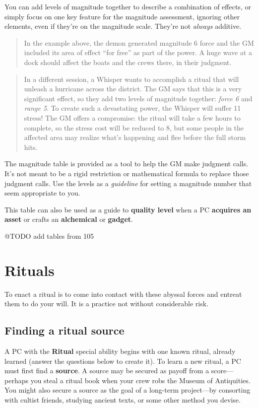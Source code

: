 \documentclass[11pt,fleqn,a5paper]{book}
\newcommand{\gameterm}[1]{\textbf{#1}}
\begin{document}
You can add levels of magnitude together to describe a combination of effects, or simply focus on one key feature for the magnitude assessment, ignoring other elements, even if they’re on the magnitude scale. They’re not \emph{always} additive.

\begin{quote}
	In the example above, the demon generated magnitude 6 force and the GM included its area of effect “for free” as part of the power. A huge wave at a dock should affect the boats and the crews there, in their judgment.
\end{quote} 

\begin{quote}
	In a different session, a Whisper wants to accomplish a ritual that will unleash a hurricane across the district. The GM says that this is a very significant effect, so they add two levels of magnitude together: \emph{force 6} and \emph{range 5}. To create such a devastating power, the Whisper will suffer 11 stress! The GM offers a compromise: the ritual will take a few hours to complete, so the stress cost will be reduced to 8, but some people in the affected area may realize what’s happening and flee before the full storm hits.
\end{quote} 

The magnitude table is provided as a tool to help the GM make judgment calls. It’s not meant to be a rigid restriction or mathematical formula to replace those judgment calls. Use the levels as a \emph{guideline} for setting a magnitude number that seem appropriate to you.

This table can also be used as a guide to \textbf{quality level} when a PC \textbf{acquires an asset }or crafts an \textbf{alchemical} or \textbf{gadget}.

@TODO add tables from 105

\chapter{Rituals}

To enact a ritual is to come into contact with these abyssal forces and entreat them to do your will. It is a practice not without considerable risk.

\section{Finding a ritual source}

A PC with the \gameterm{Ritual}  special ability begins with one known ritual, already learned (answer the questions below to create it). To learn a new ritual, a PC must first find a \textbf{source}. A source may be secured as payoff from a score---perhaps you steal a ritual book when your crew robs the Museum of Antiquities. You might also secure a source as the goal of a long-term project---by consorting with cultist friends, studying ancient texts, or some other method you devise.
\end{document}
